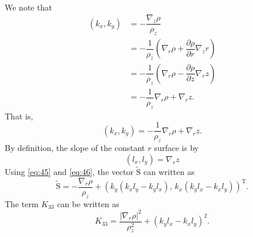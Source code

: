 \documentclass[12pt]{report}
\def\p{\partial}
\def\tilde{\widetilde}
\def\bs{\boldsymbol}
\def\Sb{\bs{\mathrm{S}}}
\begin{document}
\\
We note that 
\begin{align*}
  (k_x, k_y) &= -\dfrac{\nabla_z\rho}{\rho_z}\\
                &= -\dfrac{1}{\rho_z}\left(\nabla_r\rho +
                  \dfrac{\p\rho}{\p r}\nabla_z r\right)\\
                &= -\dfrac{1}{\rho_z}\left(\nabla_r\rho -
                  \dfrac{\p\rho}{\p z}\nabla_r z\right)\\
                &= -\dfrac{1}{\rho_z}\nabla_r\rho + \nabla_r z.
\end{align*}
That is,
\begin{equation}
  \label{eq:45}
(k_x,k_y) = -\dfrac{1}{\rho_z}\nabla_r\rho + \nabla_r z.
\end{equation}
By definition, the slope of the constant $r$ surface is by
\begin{equation}
  \label{eq:46}
  (l_x, l_y) = \nabla_r z
\end{equation}
Using \eqref{eq:45} and \eqref{eq:46}, the vector $\tilde{\Sb}$ can
written as 
\begin{equation}
  \label{eq:47}
  \tilde{\Sb} = -\dfrac{\nabla_r\rho}{\rho_z} +
  \left( k_y(k_xl_y - k_yl_x),\, k_x(k_yl_x - k_xl_y)\right)^\textrm{T}. 
\end{equation}
The term $K_{33}$ can be written as
\begin{equation}
  \label{eq:49}
   K_{33} = \dfrac{|\nabla_r\rho|^2}{\rho_z^2}+ (k_yl_x - k_xl_y)^2.
\end{equation}
\end{document}
